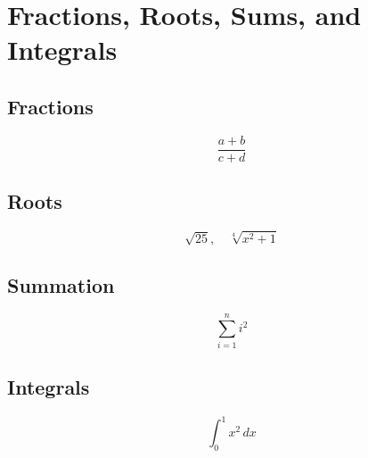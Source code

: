 \documentclass{article}
\begin{document}
\section*{Fractions, Roots, Sums, and Integrals}

\subsection*{Fractions}
\[
\frac{a + b}{c + d}
\]

\subsection*{Roots}
\[
\sqrt{25}, \quad \sqrt[4]{x^2 + 1}
\]

\subsection*{Summation}
\[
\sum_{i=1}^{n} i^2
\]

\subsection*{Integrals}
\[
\int_{0}^{1} x^2 \, dx
\]
\end{document}
